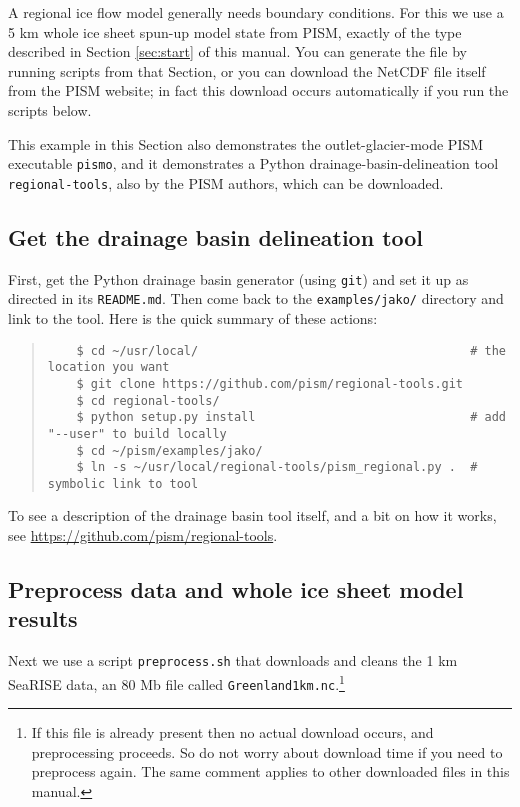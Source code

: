A regional ice flow model generally needs boundary conditions.  For this we use a 5 km whole ice sheet spun-up model state from PISM, exactly of the type described in Section \ref{sec:start} of this manual.  You can generate the file by running scripts from that Section, or you can download the NetCDF file itself from the PISM website; in fact this download occurs automatically if you run the scripts below.

This example in this Section also demonstrates the outlet-glacier-mode PISM executable \texttt{pismo}, and it demonstrates a Python drainage-basin-delineation tool \texttt{regional-tools}, also by the PISM authors, which can be downloaded.

\subsection*{Get the drainage basin delineation tool}
First, get the Python drainage basin generator (using \texttt{git}) and set it up as directed in its \texttt{README.md}.  Then come back to the \texttt{examples/jako/} directory and link to the tool.  Here is the quick summary of these actions:
\begin{quote}\small
\begin{verbatim}
    $ cd ~/usr/local/                                      # the location you want
    $ git clone https://github.com/pism/regional-tools.git
    $ cd regional-tools/
    $ python setup.py install                              # add "--user" to build locally
    $ cd ~/pism/examples/jako/
    $ ln -s ~/usr/local/regional-tools/pism_regional.py .  # symbolic link to tool
\end{verbatim}
\normalsize\end{quote}
To see a description of the drainage basin tool itself, and a bit on how it
works, see \url{https://github.com/pism/regional-tools}.

\subsection*{Preprocess data and whole ice sheet model results}
Next we use a script \texttt{preprocess.sh} that downloads and cleans the 1 km SeaRISE data, an 80 Mb file called \texttt{Greenland1km.nc}.\footnote{If this file is already present then no actual download occurs, and preprocessing proceeds.  So do not worry about download time if you need to preprocess again.  The same comment applies to other downloaded files in this manual.}

